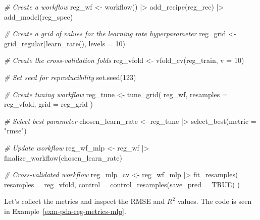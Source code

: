 \documentclass[
  letterpaper,
]{latex/krantz}
\newenvironment{Shaded}{\begin{snugshade}}{\end{snugshade}}
\newcommand{\AttributeTok}[1]{\textcolor[rgb]{0.00,0.00,0.00}{#1}}
\newcommand{\CommentTok}[1]{\textcolor[rgb]{0.00,0.00,0.00}{\textit{#1}}}
\newcommand{\ConstantTok}[1]{\textcolor[rgb]{0.00,0.00,0.00}{#1}}
\newcommand{\DecValTok}[1]{\textcolor[rgb]{0.00,0.00,0.00}{#1}}
\newcommand{\FunctionTok}[1]{\textcolor[rgb]{0.00,0.00,0.00}{#1}}
\newcommand{\NormalTok}[1]{\textcolor[rgb]{0.00,0.00,0.00}{#1}}
\newcommand{\OtherTok}[1]{\textcolor[rgb]{0.00,0.00,0.00}{#1}}
\newcommand{\SpecialCharTok}[1]{\textcolor[rgb]{0.00,0.00,0.00}{#1}}
\newcommand{\StringTok}[1]{\textcolor[rgb]{0.00,0.00,0.00}{#1}}
\theoremstyle{definition}
\theoremstyle{remark}
\begin{document}
\begin{Shaded}
\begin{Highlighting}[]
\CommentTok{\# Create a workflow}
\NormalTok{reg\_wf }\OtherTok{\textless{}{-}}
  \FunctionTok{workflow}\NormalTok{() }\SpecialCharTok{|\textgreater{}}
  \FunctionTok{add\_recipe}\NormalTok{(reg\_rec) }\SpecialCharTok{|\textgreater{}}
  \FunctionTok{add\_model}\NormalTok{(reg\_spec)}

\CommentTok{\# Create a grid of values for the learning rate hyperparameter}
\NormalTok{reg\_grid }\OtherTok{\textless{}{-}}
  \FunctionTok{grid\_regular}\NormalTok{(}\FunctionTok{learn\_rate}\NormalTok{(), }\AttributeTok{levels =} \DecValTok{10}\NormalTok{)}

\CommentTok{\# Create the cross{-}validation folds}
\NormalTok{reg\_vfold }\OtherTok{\textless{}{-}} \FunctionTok{vfold\_cv}\NormalTok{(reg\_train, }\AttributeTok{v =} \DecValTok{10}\NormalTok{)}

\CommentTok{\# Set seed for reproducibility}
\FunctionTok{set.seed}\NormalTok{(}\DecValTok{123}\NormalTok{)}

\CommentTok{\# Create tuning workflow}
\NormalTok{reg\_tune }\OtherTok{\textless{}{-}}
  \FunctionTok{tune\_grid}\NormalTok{(}
\NormalTok{    reg\_wf,}
    \AttributeTok{resamples =}\NormalTok{ reg\_vfold,}
    \AttributeTok{grid =}\NormalTok{ reg\_grid}
\NormalTok{  )}

\CommentTok{\# Select best parameter}
\NormalTok{chosen\_learn\_rate }\OtherTok{\textless{}{-}}\NormalTok{ reg\_tune }\SpecialCharTok{|\textgreater{}} \FunctionTok{select\_best}\NormalTok{(}\AttributeTok{metric =} \StringTok{"rmse"}\NormalTok{)}

\CommentTok{\# Update workflow}
\NormalTok{reg\_wf\_mlp }\OtherTok{\textless{}{-}}
\NormalTok{  reg\_wf }\SpecialCharTok{|\textgreater{}}
  \FunctionTok{finalize\_workflow}\NormalTok{(chosen\_learn\_rate)}

\CommentTok{\# Cross{-}validated workflow}
\NormalTok{reg\_mlp\_cv }\OtherTok{\textless{}{-}}
\NormalTok{  reg\_wf\_mlp }\SpecialCharTok{|\textgreater{}}
  \FunctionTok{fit\_resamples}\NormalTok{(}
    \AttributeTok{resamples =}\NormalTok{ reg\_vfold,}
    \AttributeTok{control =} \FunctionTok{control\_resamples}\NormalTok{(}\AttributeTok{save\_pred =} \ConstantTok{TRUE}\NormalTok{)}
\NormalTok{  )}
\end{Highlighting}
\end{Shaded}

Let's collect the metrics and inspect the RMSE and \(R^2\) values. The
code is seen in Example~\ref{exm-pda-reg-metrics-mlp}.
\end{document}
